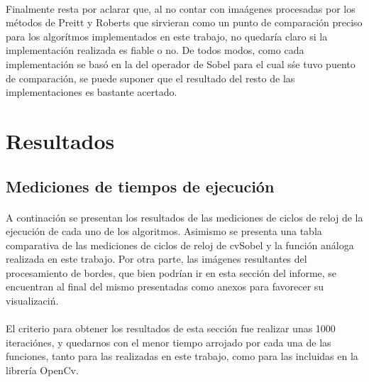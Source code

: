 \documentclass[11pt, a4paper]{article}
\begin{document}
\paragraph*{}
Finalmente resta por aclarar que, al no contar con ima\'agenes procesadas por los m\'etodos de Preitt y Roberts que sirvieran como un punto de comparaci\'on preciso para los algor\'itmos implementados en este trabajo, no quedar\'ia claro si la implementaci\'on realizada es fiable o no. De todos modos, como cada implementaci\'on se bas\'o en la del operador de Sobel para el cual s\' se tuvo puento de comparaci\'on, se puede suponer que el resultado del resto de las implementaciones es bastante acertado.


\newpage

\section{Resultados}

\subsection{Mediciones de tiempos de ejecuci\'on}
\paragraph{}
A continaci\'on se presentan los resultados de las mediciones de ciclos de reloj de la ejecuci\'on de cada uno de los algoritmos. Asimismo se presenta una tabla comparativa de las mediciones de ciclos de reloj de cvSobel y la funci\'on an\'aloga realizada en este trabajo.
Por otra parte, las im\'agenes resultantes del procesamiento de bordes, que bien podr\'ian ir en esta secci\'on del informe, se encuentran al final del mismo presentadas como anexos para favorecer su visualizaci\'n.

\paragraph{}
El criterio para obtener los resultados de esta secci\'on fue realizar unas 1000 iteraci\'ones, y quedarnos con el menor tiempo arrojado por cada una de las funciones, tanto para las realizadas en este trabajo, como para las incluidas en la librer\'ia OpenCv.

\vspace{1cm}
\end{document}
